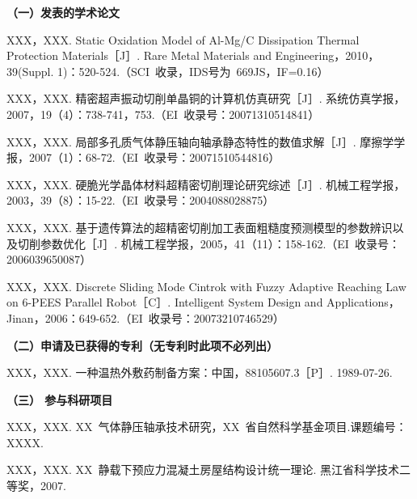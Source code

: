 
\begin{publication}
	\noindent\songti\textbf{（一）发表的学术论文}
	\begin{publist}
		\item	XXX，XXX. Static Oxidation Model of Al-Mg/C Dissipation Thermal Protection Materials［J］. Rare Metal Materials and Engineering，2010，39(Suppl. 1)：520-524.（SCI~收录，IDS号为~669JS，IF=0.16）
		\item XXX，XXX. 精密超声振动切削单晶铜的计算机仿真研究［J］. 系统仿真学报，2007，19（4）：738-741，753.（EI~收录号：20071310514841）
		\item XXX，XXX. 局部多孔质气体静压轴向轴承静态特性的数值求解［J］. 摩擦学学报，2007（1）：68-72.（EI~收录号：20071510544816）
		\item XXX，XXX. 硬脆光学晶体材料超精密切削理论研究综述［J］. 机械工程学报，2003，39（8）：15-22.（EI~收录号：2004088028875）
		\item XXX，XXX. 基于遗传算法的超精密切削加工表面粗糙度预测模型的参数辨识以及切削参数优化［J］. 机械工程学报，2005，41（11）：158-162.（EI~收录号：2006039650087）
		\item XXX，XXX. Discrete Sliding Mode Cintrok with Fuzzy Adaptive Reaching Law on 6-PEES Parallel Robot［C］. Intelligent System Design and Applications，Jinan，2006：649-652.（EI~收录号：20073210746529）
	\end{publist}

	\noindent\songti\textbf{（二）申请及已获得的专利（无专利时此项不必列出）}
	\begin{publist}
		\item XXX，XXX. 一种温热外敷药制备方案：中国，88105607.3［P］. 1989-07-26.
	\end{publist}

	\noindent\songti\textbf{（三） 参与科研项目}
	\begin{publist}
		\item	XXX，XXX. XX~气体静压轴承技术研究，XX~省自然科学基金项目.课题编号：XXXX.
		\item XXX，XXX. XX~静载下预应力混凝土房屋结构设计统一理论. 黑江省科学技术二等奖，2007.
	\end{publist}
\end{publication}
